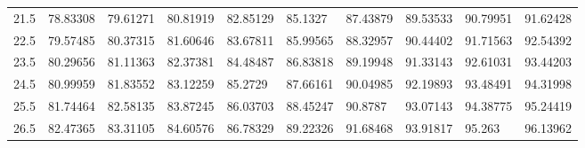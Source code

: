 \documentclass[10pt,twocolumn,letterpaper]{article}
\begin{document}
\begin{table}
{\begin{tabular}{llllllllll}
    21.5            & 78.83308                               & 79.61271                               & 80.81919                                & 82.85129                                & 85.1327                                 & 87.43879                                & 89.53533                                & 90.79951                                & 91.62428                                \\
    22.5            & 79.57485                               & 80.37315                               & 81.60646                                & 83.67811                                & 85.99565                                & 88.32957                                & 90.44402                                & 91.71563                                & 92.54392                                \\
    23.5            & 80.29656                               & 81.11363                               & 82.37381                                & 84.48487                                & 86.83818                                & 89.19948                                & 91.33143                                & 92.61031                                & 93.44203                                \\
    24.5            & 80.99959                               & 81.83552                               & 83.12259                                & 85.2729                                 & 87.66161                                & 90.04985                                & 92.19893                                & 93.48491                                & 94.31998                                \\
    25.5            & 81.74464                               & 82.58135                               & 83.87245                                & 86.03703                                & 88.45247                                & 90.8787                                 & 93.07143                                & 94.38775                                & 95.24419                                \\
    26.5            & 82.47365                               & 83.31105                               & 84.60576                                & 86.78329                                & 89.22326                                & 91.68468                                & 93.91817                                & 95.263                                  & 96.13962                                \\

\end{tabular}}
\end{table}
\end{document}
